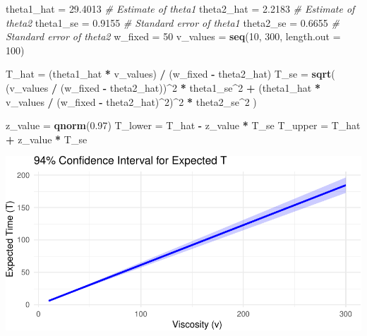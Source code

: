 \documentclass[
  11pt,
]{article}
\newenvironment{Shaded}{\begin{snugshade}}{\end{snugshade}}
\newcommand{\AttributeTok}[1]{\textcolor[rgb]{0.13,0.29,0.53}{#1}}
\newcommand{\CommentTok}[1]{\textcolor[rgb]{0.56,0.35,0.01}{\textit{#1}}}
\newcommand{\DecValTok}[1]{\textcolor[rgb]{0.00,0.00,0.81}{#1}}
\newcommand{\FloatTok}[1]{\textcolor[rgb]{0.00,0.00,0.81}{#1}}
\newcommand{\FunctionTok}[1]{\textcolor[rgb]{0.13,0.29,0.53}{\textbf{#1}}}
\newcommand{\NormalTok}[1]{#1}
\newcommand{\OtherTok}[1]{\textcolor[rgb]{0.56,0.35,0.01}{#1}}
\newcommand{\SpecialCharTok}[1]{\textcolor[rgb]{0.81,0.36,0.00}{\textbf{#1}}}
\begin{document}
\begin{verbatim}
\end{verbatim}

\begin{Shaded}
\begin{Highlighting}[]
\NormalTok{theta1\_hat }\OtherTok{=} \FloatTok{29.4013}  \CommentTok{\# Estimate of theta1}
\NormalTok{theta2\_hat }\OtherTok{=} \FloatTok{2.2183}   \CommentTok{\# Estimate of theta2}
\NormalTok{theta1\_se }\OtherTok{=} \FloatTok{0.9155}    \CommentTok{\# Standard error of theta1}
\NormalTok{theta2\_se }\OtherTok{=} \FloatTok{0.6655}    \CommentTok{\# Standard error of theta2}
\NormalTok{w\_fixed }\OtherTok{=} \DecValTok{50}
\NormalTok{v\_values }\OtherTok{=} \FunctionTok{seq}\NormalTok{(}\DecValTok{10}\NormalTok{, }\DecValTok{300}\NormalTok{, }\AttributeTok{length.out =} \DecValTok{100}\NormalTok{)}

\NormalTok{T\_hat }\OtherTok{=}\NormalTok{ (theta1\_hat }\SpecialCharTok{*}\NormalTok{ v\_values) }\SpecialCharTok{/}\NormalTok{ (w\_fixed }\SpecialCharTok{{-}}\NormalTok{ theta2\_hat)}
\NormalTok{T\_se }\OtherTok{=} \FunctionTok{sqrt}\NormalTok{(}
\NormalTok{  (v\_values }\SpecialCharTok{/}\NormalTok{ (w\_fixed }\SpecialCharTok{{-}}\NormalTok{ theta2\_hat))}\SpecialCharTok{\^{}}\DecValTok{2} \SpecialCharTok{*}\NormalTok{ theta1\_se}\SpecialCharTok{\^{}}\DecValTok{2} \SpecialCharTok{+}
\NormalTok{  (theta1\_hat }\SpecialCharTok{*}\NormalTok{ v\_values }\SpecialCharTok{/}\NormalTok{ (w\_fixed }\SpecialCharTok{{-}}\NormalTok{ theta2\_hat)}\SpecialCharTok{\^{}}\DecValTok{2}\NormalTok{)}\SpecialCharTok{\^{}}\DecValTok{2} \SpecialCharTok{*}\NormalTok{ theta2\_se}\SpecialCharTok{\^{}}\DecValTok{2}
\NormalTok{)}

\NormalTok{z\_value }\OtherTok{=} \FunctionTok{qnorm}\NormalTok{(}\FloatTok{0.97}\NormalTok{)}
\NormalTok{T\_lower }\OtherTok{=}\NormalTok{ T\_hat }\SpecialCharTok{{-}}\NormalTok{ z\_value }\SpecialCharTok{*}\NormalTok{ T\_se}
\NormalTok{T\_upper }\OtherTok{=}\NormalTok{ T\_hat }\SpecialCharTok{+}\NormalTok{ z\_value }\SpecialCharTok{*}\NormalTok{ T\_se}
\end{Highlighting}
\end{Shaded}

\includegraphics{ReportAssignment2_files/figure-latex/unnamed-chunk-29-1.pdf}
\end{document}
